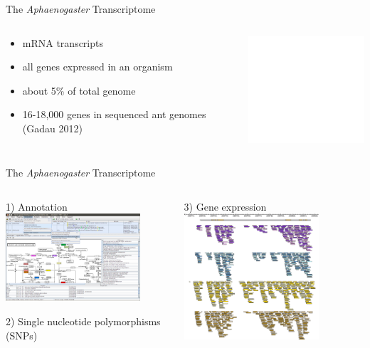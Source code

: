 \documentclass{beamer}
\begin{document}
\begin{frame}{The \textit{Aphaenogaster }Transcriptome}
	\begin{columns}
		\begin{column}{5cm}
			\begin{itemize}
				\item mRNA transcripts
				\item all genes expressed in an organism
				\item about 5\% of total genome
				\item 16-18,000 genes in sequenced ant genomes (Gadau 2012)
			\end{itemize}
		\end{column}
		\begin{column}{5cm}
			\begin{center}
				\includegraphics<1>[width=5cm]{FactSheet_Transcriptome.pdf}\\
			\end{center}
		\end{column}
	\end{columns}
\end{frame}


\begin{frame}{The \textit{Aphaenogaster }Transcriptome}
	\begin{columns}
		\begin{column}{5cm}
			1) Annotation
			\vspace{.5cm}
			\includegraphics[width=5cm]{BLAST2GO_kegg.png}			

			2) Single nucleotide polymorphisms (SNPs) 		
		\end{column}
		\begin{column}{5cm}
			3) Gene expression
			\vspace{.5cm}
			\includegraphics[width=5cm]{rna_seq_bg.png}
		\end{column}
	\end{columns}
\end{frame}
\end{document}
